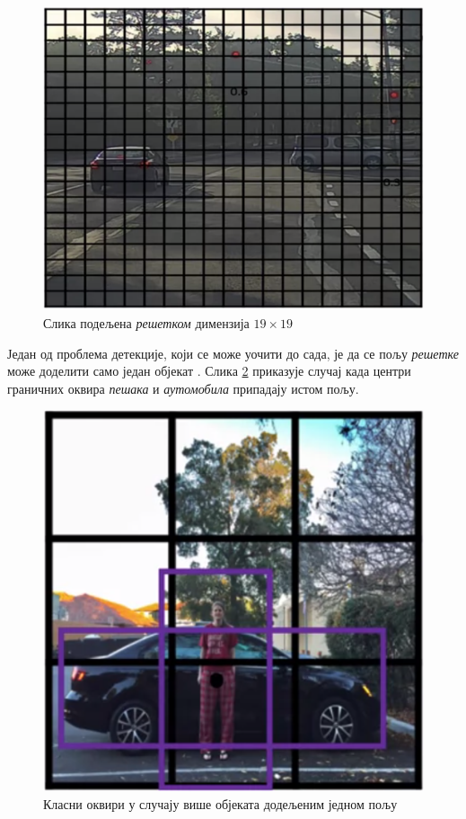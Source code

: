 \documentclass[12pt, а4paper]{article}
\begin{document}
\begin{figure}[H]
  \centering
      \includegraphics[scale=0.6]{slike/ngNonMax2.png}
  \caption{Слика подељена \textit{решетком} димензија $19 \times 19$}
  \label{fig:ng_NonMax2}
\end{figure}

Један од проблема детекције, који се може уочити до сада, је да се пољу
\textit{решетке} може доделити само један објекат \cite{ngAnchor}.
Слика \ref{fig:ng_Anchor1} приказује случај када центри граничних оквира
\textit{пешака} и \textit{аутомобила} припадају истом пољу.

\begin{figure}[H]
  \centering
      \includegraphics[scale=0.6]{slike/ngAnchor1.png}
  \caption{Класни оквири у случају више објеката додељеним једном пољу}
  \label{fig:ng_Anchor1}
\end{figure}
\end{document}
